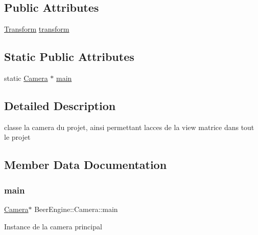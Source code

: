 \subsection*{Public Attributes}
\begin{DoxyCompactItemize}
\item 
\mbox{\hyperlink{class_beer_engine_1_1_transform}{Transform}} \mbox{\hyperlink{class_beer_engine_1_1_camera_a4bbec6c322e5f260eca34a98d2eaeb93}{transform}}
\end{DoxyCompactItemize}
\subsection*{Static Public Attributes}
\begin{DoxyCompactItemize}
\item 
static \mbox{\hyperlink{class_beer_engine_1_1_camera}{Camera}} $\ast$ \mbox{\hyperlink{class_beer_engine_1_1_camera_aca558a665afcf487dc66e7deb5edba58}{main}}
\end{DoxyCompactItemize}


\subsection{Detailed Description}
classe la camera du projet, ainsi permettant l\textquotesingle{}acces de la view matrice dans tout le projet 

\subsection{Member Data Documentation}
\mbox{\label{class_beer_engine_1_1_camera_aca558a665afcf487dc66e7deb5edba58}} 
\subsubsection{\texorpdfstring{main}{main}}
{\footnotesize\ttfamily \mbox{\hyperlink{class_beer_engine_1_1_camera}{Camera}}$\ast$ Beer\+Engine\+::\+Camera\+::main\hspace{0.3cm}{\ttfamily [static]}}

Instance de la camera principal \mbox{\label{class_beer_engine_1_1_camera_a4bbec6c322e5f260eca34a98d2eaeb93}} 
